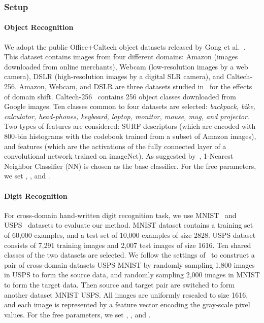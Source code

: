\documentclass[10pt,twocolumn,letterpaper]{article}
\begin{document}
\subsubsection{Setup}
\label{sec:setup}
\paragraph{Object Recognition} We adopt the public Office+Caltech object datasets released by Gong et al.~\cite{Gong2012}. This dataset contains images from four different domains: Amazon (images downloaded from online merchants), Webcam (low-resolution images by a web camera), DSLR (high-resolution images by a digital SLR camera), and Caltech-256. Amazon, Webcam, and DSLR are three datasets studied in~\cite{Saenko2010} for the effects of domain shift. Caltech-256~\cite{Griffin2007} contains 256 object classes downloaded from Google images. Ten classes common to four datasets are selected: \textit{backpack, bike, calculator, head-phones, keyboard, laptop, monitor, mouse, mug, and projector}.
Two types of features are considered: SURF descriptors (which are encoded with 800-bin histograms with the codebook trained from a subset of Amazon images), and  features (which are the activations of the  fully connected layer of a convolutional network trained on imageNet).
As suggested by~\cite{Gong2012}, 1-Nearest Neighbor Classifier (NN) is chosen as the base classifier. For the free parameters, we set , , and .

\paragraph{Digit Recognition}
For cross-domain hand-written digit recognition task, we use MNIST~\cite{LeCun1998} and USPS~\cite{Hull1994} datasets to evaluate our method. MNIST dataset contains a training set of 60,000 examples, and a test set of 10,000 examples of size 2828. USPS dataset consists of 7,291 training images and 2,007 test images of size 1616. Ten shared classes of the two datasets are selected. We follow the settings of~\cite{Long2013,Long2014} to construct a pair of cross-domain datasets USPS  MNIST by randomly sampling 1,800 images in USPS to form the source data, and randomly sampling 2,000 images in MNIST to form the target data. Then source and target pair are switched to form another dataset MNIST  USPS. All images are uniformly rescaled to size 1616, and each image is represented by a feature vector encoding the gray-scale pixel values.
For the free parameters, we set , , and .
\end{document}
